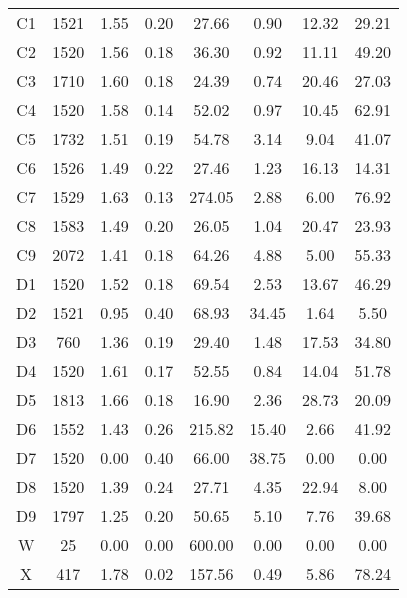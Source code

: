 \begin{table}[h!]
\begin{tabular}{c c c c c c c c}
			C1	 & 	1521	 & 	1.55	 & 	0.20	 & 	27.66	 & 	0.90	 & 	12.32	 & 	29.21 \\
			C2	 & 	1520	 & 	1.56	 & 	0.18	 & 	36.30	 & 	0.92	 & 	11.11	 & 	49.20 \\
			C3	 & 	1710	 & 	1.60	 & 	0.18	 & 	24.39	 & 	0.74	 & 	20.46	 & 	27.03 \\
			C4	 & 	1520	 & 	1.58	 & 	0.14	 & 	52.02	 & 	0.97	 & 	10.45	 & 	62.91 \\
			C5	 & 	1732	 & 	1.51	 & 	0.19	 & 	54.78	 & 	3.14	 & 	9.04	 & 	41.07 \\
			C6	 & 	1526	 & 	1.49	 & 	0.22	 & 	27.46	 & 	1.23	 & 	16.13	 & 	14.31 \\
			C7	 & 	1529	 & 	1.63	 & 	0.13	 & 	274.05	 & 	2.88	 & 	6.00	 & 	76.92 \\
			C8	 & 	1583	 & 	1.49	 & 	0.20	 & 	26.05	 & 	1.04	 & 	20.47	 & 	23.93 \\
			C9	 & 	2072	 & 	1.41	 & 	0.18	 & 	64.26	 & 	4.88	 & 	5.00	 & 	55.33 \\
			D1	 & 	1520	 & 	1.52	 & 	0.18	 & 	69.54	 & 	2.53	 & 	13.67	 & 	46.29 \\
			D2	 & 	1521	 & 	0.95	 & 	0.40	 & 	68.93	 & 	34.45	 & 	1.64	 & 	5.50 \\
			D3	 & 	760	 & 	1.36	 & 	0.19	 & 	29.40	 & 	1.48	 & 	17.53	 & 	34.80 \\
			D4	 & 	1520	 & 	1.61	 & 	0.17	 & 	52.55	 & 	0.84	 & 	14.04	 & 	51.78 \\
			D5	 & 	1813	 & 	1.66	 & 	0.18	 & 	16.90	 & 	2.36	 & 	28.73	 & 	20.09 \\
			D6	 & 	1552	 & 	1.43	 & 	0.26	 & 	215.82	 & 	15.40	 & 	2.66	 & 	41.92 \\
			D7	 & 	1520	 & 	0.00	 & 	0.40	 & 	66.00	 & 	38.75	 & 	0.00	 & 	0.00 \\
			D8	 & 	1520	 & 	1.39	 & 	0.24	 & 	27.71	 & 	4.35	 & 	22.94	 & 	8.00 \\
			D9	 & 	1797	 & 	1.25	 & 	0.20	 & 	50.65	 & 	5.10	 & 	7.76	 & 	39.68 \\
			W	 & 	25	 & 	0.00	 & 	0.00	 & 	600.00	 & 	0.00	 & 	0.00	 & 	0.00 \\
			X	 & 	417	 & 	1.78	 & 	0.02	 & 	157.56	 & 	0.49	 & 	5.86	 & 	78.24 \\
			\hline		
		\end{tabular}
		
		\label{table:soil_prop}
	\end{table}	
	